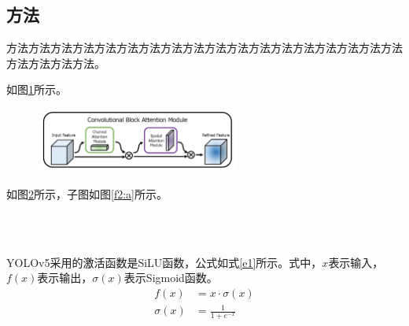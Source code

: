 \documentclass[UTF-8,a4paper,twoside]{article}
\numberwithin{equation}{section} %
\numberwithin{table}{section} %
\numberwithin{figure}{section} %
\begin{document}
\subsection{方法}
方法方法方法方法方法方法方法方法方法方法方法方法方法\cite{mobilenet}方法方法方法方法方法方法\cite{wang2020cspnet,mobilenet}方法方法方法。

如图\ref{f1}所示。
\begin{figure}[!h]
	\centering
	\includegraphics[width=0.6\textwidth]{cbam1.png}
	\label{f1}
\end{figure}

如图\ref{f2}所示，子图如图\ref{f2:a}所示。
\begin{figure}[!h]
	\centering
	\\
	\\
	\label{f2}
\end{figure}

YOLOv5采用的激活函数是SiLU函数，公式如式\eqref{e1}所示。式中，$x$表示输入，$f(x)$表示输出，$\sigma(x)$表示Sigmoid函数。
\begin{subequations}
  \label{e1}
  \begin{align}
    f(x)      & = x \cdot \sigma(x)    \\
    \sigma(x) & = \frac{1}{1 + e^{-x}}
  \end{align}
\end{subequations}
\end{document}
